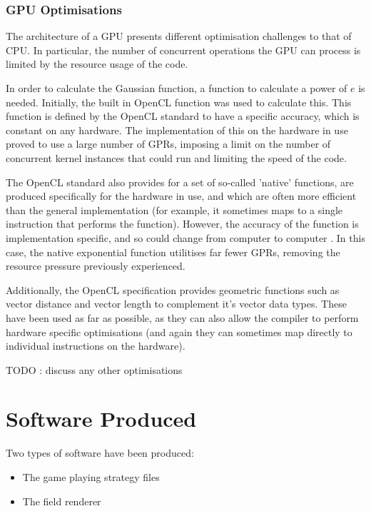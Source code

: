 \documentclass[10pt]{article} \usepackage[a4paper]{geometry}
\begin{document}
\subsubsection{\ac{GPU} Optimisations}

The architecture of a \ac{GPU} presents different optimisation challenges to
that of \ac{CPU}. In particular, the number of concurrent operations the
\ac{GPU} can process is limited by the resource usage of the code.

In order to calculate the Gaussian function, a function to calculate a power of
$e$ is needed. Initially, the built in OpenCL function was used to calculate
this. This function is defined by the OpenCL standard to have a specific
accuracy, which is constant on any hardware. The implementation of this on the
hardware in use proved to use a large number of \acp{GPR}, imposing a limit on
the number of concurrent kernel instances that could run and limiting the speed
of the code.

The OpenCL standard also provides for a set of so-called 'native' functions, are
produced specifically for the hardware in use, and which are often more
efficient than the general implementation (for example, it sometimes maps to a
single instruction that performs the function). However, the accuracy of the
function is implementation specific, and so could change from computer to
computer \cite{openCl11Spec}. In this case, the native exponential function
utilitises far fewer \acp{GPR}, removing the resource pressure previously
experienced.

Additionally, the OpenCL specification provides geometric functions such as
vector distance and vector length to complement it's vector data types. These
have been used as far as possible, as they can also allow the compiler to
perform hardware specific optimisations (and again they can sometimes map
directly to individual instructions on the hardware).\cite{openCl11Spec}

TODO : discuss any other optimisations

\section{Software Produced}

Two types of software have been produced:
\begin{itemize}
\item The game playing strategy files
\item The field renderer
\end{itemize}
\end{document}
